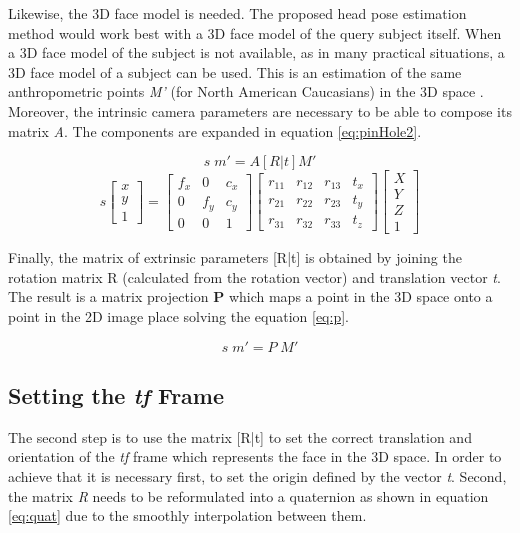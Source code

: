 \documentclass{sig-alternate}
\begin{document}
Likewise, the 3D face model is needed. The proposed head pose estimation method would work best with a 3D face model of the query subject itself. When a 3D face model of the subject is not available, as in many practical situations, a 3D face model of a subject can be used. This is an estimation of the same anthropometric points \textit{M'} (for North American Caucasians) in the 3D space \cite{farkas1994anthropometry}. Moreover, the intrinsic camera parameters are necessary to be able to compose its matrix \textit{A}. The components are expanded in equation \ref{eq:pinHole2}.	

\begin{equation}
s  \; m' = A [R|t] M'
\label{eq:pinHole}
\end{equation}
\begin{equation}
s
\begin{bmatrix}
x \\
y \\
1
\end{bmatrix}
=
\begin{bmatrix}
f_x & 0 & c_x  \\
0 & f_y & c_y  \\
0 & 0 & 1 
\end{bmatrix}
\begin{bmatrix}
r_{11} & r_{12} & r_{13} & t_x  \\
r_{21} & r_{22} & r_{23} & t_y  \\
r_{31} & r_{32} & r_{33} & t_z  
\end{bmatrix}
\begin{bmatrix}
X \\
Y \\
Z \\
1
\end{bmatrix}
\label{eq:pinHole2}
\end{equation}

Finally, the matrix of extrinsic parameters [R|t] is obtained by joining the rotation matrix R (calculated from the rotation vector) and translation vector \textit{t}. The result is a matrix projection \textbf{P} which maps a point in the 3D space onto a point in the 2D image place solving the equation \ref{eq:p}.

\begin{equation}
s  \; m' = P \; M'
\label{eq:p}
\end{equation}

\subsection{Setting the \textit{tf} Frame}
The second step is to use the matrix [R|t] to set the correct translation and orientation of the \textit{tf} frame which represents the face in the 3D space. In order to achieve that it is necessary first, to set the origin defined by the vector \textit{t}. Second, the matrix \textit{R} needs to be reformulated into a quaternion as shown in equation \ref{eq:quat} due to the smoothly interpolation between them.
\end{document}
